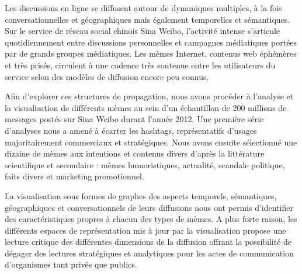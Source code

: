 
Les discussions en ligne se diffusent autour de dynamiques multiples, à la fois conversationnelles et géographiques mais également temporelles et sémantiques. Sur le service de réseau social chinois Sina Weibo, l’activité intense s’articule quotidiennement entre discussions personnelles et campagnes médiatiques portées par de grands groupes médiatiques. Les mèmes Internet, contenus web éphémères et très prisés, circulent à une cadence très soutenue entre les utilisateurs du service selon des modèles de diffusion encore peu connus. 

Afin d’explorer ces structures de propagation, nous avons procéder à l’analyse et la visualisation de différents mèmes au sein d’un échantillon de 200 millions de messages postés sur Sina Weibo durant l’année 2012. Une première série d’analyses nous a amené à écarter les hashtags, représentatifs d’usages majoritairement commerciaux et stratégiques. Nous avons ensuite sélectionné une dizaine de mèmes aux intentions et contenus divers d’après la littérature scientifique et secondaire : mèmes humoristiques, actualité, scandale politique, faits divers et marketing promotionnel. 

La visualisation sous formes de graphes des aspects temporels, sémantiques, géographiques et conversationnels de leurs diffusions nous ont permis d’identifier des caractéristiques propres à chacun des types de mèmes. A plus forte raison, les différents espaces de représentation mis à jour par la visualisation propose une lecture critique des différentes dimensions de la diffusion offrant la possibilité de dégager des lectures stratégiques et analytiques pour les actes de communication d’organismes tant privés que publics.


